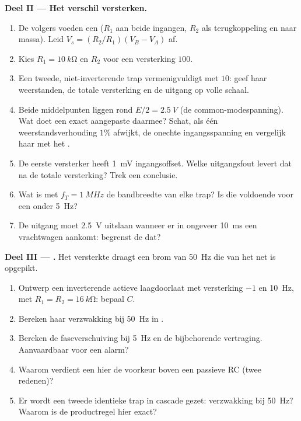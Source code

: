 \begin{problem}
\medskip
\noindent\textbf{Deel II --- Het verschil versterken.}
\begin{enumerate}[resume]
  \item De volgers voeden een  ($R_1$ aan beide
        ingangen, $R_2$ als terugkoppeling en naar massa). Leid $V_s =
        (R_2/R_1)(V_B - V_A)$ af.
  \item Kies $R_1 = \qty{10}{k\ohm}$ en $R_2$ voor een versterking $100$.
  \item Een tweede, niet-inverterende trap vermenigvuldigt met $10$: geef haar
        weerstanden, de totale versterking en de uitgang op volle schaal.
  \item Beide middelpunten liggen rond $E/2 = \qty{2.5}{V}$ (de
        common-modespanning). Wat doet een exact aangepaste 
        daarmee? Schat, als één weerstandsverhouding $1\%$ afwijkt, de
        onechte ingangsspanning en vergelijk haar met het .
  \item De eerste versterker heeft \qty{1}{mV} ingangsoffset. Welke uitgangsfout
        levert dat na de totale versterking? Trek een conclusie.
  \item Wat is met $f_T = \qty{1}{MHz}$ de bandbreedte van elke trap?
        Is die voldoende voor een  onder \qty{5}{Hz}?
  \item De uitgang moet \qty{2.5}{V} uitslaan wanneer er in ongeveer
        \qty{10}{ms} een vrachtwagen aankomt: begrenst de  dat?
\end{enumerate}

\medskip
\noindent\textbf{Deel III --- .}
Het versterkte  draagt een brom van \qty{50}{Hz} die van het net is
opgepikt.
\begin{enumerate}[resume]
  \item Ontwerp een inverterende actieve laagdoorlaat met versterking $-1$ en 
        \qty{10}{Hz}, met $R_1 = R_2 = \qty{16}{k\ohm}$: bepaal $C$.
  \item Bereken haar verzwakking bij \qty{50}{Hz} in .
  \item Bereken de faseverschuiving bij \qty{5}{Hz} en de bijbehorende
        vertraging. Aanvaardbaar voor een alarm?
  \item Waarom verdient een  hier de voorkeur boven een passieve RC
        (twee redenen)?
  \item Er wordt een tweede identieke trap in cascade gezet: verzwakking bij \qty{50}{Hz}?
        Waarom is de productregel hier exact?
\end{enumerate}


\end{problem}

